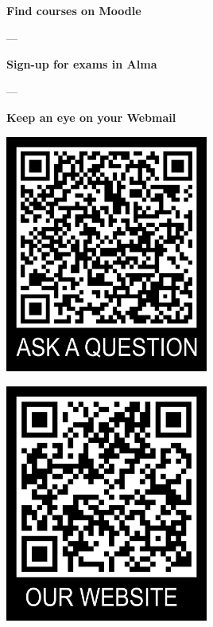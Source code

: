 \documentclass[aspectratio=169,hyperref={unicode}]{beamer}
\begin{document}
\begin{frame}
\begin{center}
\textbf{Find courses on Moodle}

---

\textbf{Sign-up for exams in Alma}

---

\textbf{Keep an eye on your Webmail}

\vspace{1em}

\begin{minipage}{0.4\textwidth}
\centering
    \includegraphics[width=0.5\textwidth]{../QRtemplate_5.png}
  \end{minipage}
  \hfill
  \begin{minipage}{0.4\textwidth}
  \centering
    \includegraphics[width=0.5\textwidth]{../QRtemplate_4.png}
  \end{minipage}
\end{center}
\end{frame}
\end{document}
